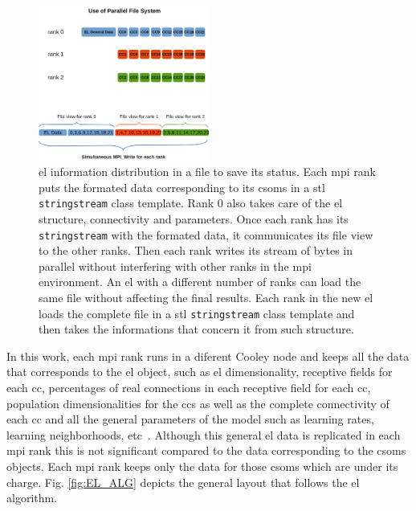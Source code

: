 \documentclass[11pt,a4paper]{article}
\begin{document}
\begin{figure}[h!]
    \centering
    \includegraphics[width=0.5\textwidth]{MPI_IO.png}
    \caption{\gls{el} information distribution in a file to save its status. Each \gls{mpi} rank puts the formated data corresponding to its \glspl{csom} in a \gls{stl} \texttt{stringstream} class template. Rank 0 also takes care of the \gls{el} structure, connectivity and parameters. Once each rank has its \texttt{stringstream} with the formated data, it communicates its file view to the other ranks. Then each rank writes its stream of bytes in parallel without interfering with other ranks in the \gls{mpi} environment. An \gls{el} with a different number of ranks can load the same file without affecting the final results. Each rank in the new \gls{el} loads the complete file in a \gls{stl} \texttt{stringstream} class template and then takes the informations that concern it from such structure.}
    \label{fig:MPI_IO}
\end{figure}

In this work, each \gls{mpi} rank runs in a diferent Cooley node and keeps all the data that corresponds to the \gls{el} object, such as \gls{el} dimensionality, receptive fields for each \gls{cc}, percentages of real connections in each receptive field for each \gls{cc}, population dimensionalities for the \glspl{cc} as well as the complete connectivity of each \gls{cc} and all the general parameters of the model such as learning rates, learning neighborhoods, etc~\cite{Dematties2018}. Although this general \gls{el} data is replicated in each \gls{mpi} rank this is not significant compared to the data corresponding to the \glspl{csom} objects. Each \gls{mpi} rank keeps only the data for those \glspl{csom} which are under its charge. Fig. \ref{fig:EL_ALG} depicts the general layout that follows the \gls{el} algorithm.
\end{document}

